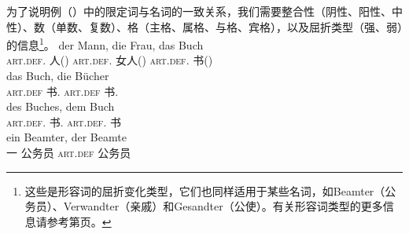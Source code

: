 为了说明例（）中的限定词与名词的一致关系，我们需要整合性（阴性、阳性、中性）、数（单数、复数）、格（主格、属格、与格、宾格），以及屈折类型（强、弱）的信息\footnote{%
这些是形容词的屈折变化类型，它们也同样适用于某些名词，如Beamter（公务员）、Verwandter（亲戚）和Gesandter（公使）。有关形容词类型的更多信息请参考第\pageref{page-Flexionsklasse-Wunderlich}页。
}。
\eal\settowidth{}
\ex 
\gll der Mann, die Frau, das Buch\\
	 \textsc{art}.\textsc{def}.\mas{} 人(\mas) \textsc{art}.\textsc{def}.\fem{} 女人(\fem) \textsc{art}.\textsc{def}.\neu{} 书(\neu)\\
\ex 
\gll das Buch, die Bücher\\
	 \textsc{art}.\textsc{def} 书.\sg{} \textsc{art}.\textsc{def} 书.\pl\\
\ex 
\gll des Buches, dem Buch\\
	 \textsc{art}.\textsc{def}.\gen{} 书.\gen{} \textsc{art}.\textsc{def}.\dat{} 书\\
\ex{} 
\gll ein Beamter, der Beamte\\
	 一 公务员 \textsc{art}.\textsc{def} 公务员\\
\zl
